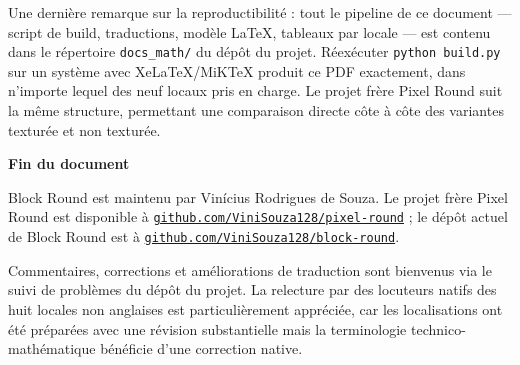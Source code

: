 \documentclass[12pt,a4paper]{scrartcl}
\newcommand{\code}[1]{\texttt{\small #1}}
\newcommand{\biblink}[2]{\href{#1}{\nolinkurl{#2}}}
\begin{document}
Une dernière remarque sur la reproductibilité : tout le pipeline de ce document --- script de build, traductions, modèle LaTeX, tableaux par locale --- est contenu dans le répertoire \code{docs\_math/} du dépôt du projet. Réexécuter \code{python build.py} sur un système avec XeLaTeX/MiKTeX produit ce PDF exactement, dans n'importe lequel des neuf locaux pris en charge. Le projet frère Pixel Round suit la même structure, permettant une comparaison directe côte à côte des variantes texturée et non texturée.

\vspace{1.2em}

\begin{center}
{\sffamily\bfseries\color{accent}Fin du document}
\end{center}

\vspace{0.6em}

Block Round est maintenu par Vinícius Rodrigues de Souza. Le projet frère Pixel Round est disponible à \biblink{https://github.com/ViniSouza128/pixel-round}{github.com/ViniSouza128/pixel-round} ; le dépôt actuel de Block Round est à \biblink{https://github.com/ViniSouza128/block-round}{github.com/ViniSouza128/block-round}.

Commentaires, corrections et améliorations de traduction sont bienvenus via le suivi de problèmes du dépôt du projet. La relecture par des locuteurs natifs des huit locales non anglaises est particulièrement appréciée, car les localisations ont été préparées avec une révision substantielle mais la terminologie technico-mathématique bénéficie d'une correction native.
\end{document}
